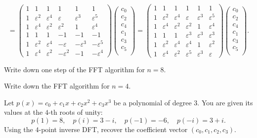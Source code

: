 $$
= \begin{pmatrix}
    1 & 1 & 1 & 1 & 1 & 1\\
    1 & \varepsilon^2 & \varepsilon^4 & \varepsilon & \varepsilon^3 & \varepsilon^5\\
    1 & \varepsilon^4 & \varepsilon^2 & \varepsilon^2 & 1 & \varepsilon^4\\
    1 & 1 & 1 & -1 & -1 & -1\\
    1 & \varepsilon^2 & \varepsilon^4 & -\varepsilon & -\varepsilon^3 & -\varepsilon^5\\
    1 & \varepsilon^4 & \varepsilon^2 & -\varepsilon^2 & -1 & -\varepsilon^4
\end{pmatrix}\begin{pmatrix}
    c_0 \\
    c_2 \\
    c_4 \\
    c_1 \\
    c_3 \\
    c_5 \\
    \end{pmatrix} =
\begin{pmatrix}
    1 & 1 & 1 & 1 & 1 & 1\\
    1 & \varepsilon^2 & \varepsilon^4 & \varepsilon & \varepsilon^3 & \varepsilon^5\\
    1 & \varepsilon^4 & \varepsilon^2 & \varepsilon^2 & 1 & \varepsilon^4\\
    1 & 1 & 1 & \varepsilon^3 & \varepsilon^3 & \varepsilon^3\\
    1 & \varepsilon^2 & \varepsilon^4 & \varepsilon^4 & 1 & \varepsilon^2\\
    1 & \varepsilon^4 & \varepsilon^2 & \varepsilon^5 & \varepsilon^3 & \varepsilon
\end{pmatrix}    \begin{pmatrix}
    c_0 \\
    c_2 \\
    c_4 \\
    c_1 \\
    c_3 \\
    c_5 \\
    \end{pmatrix}.
$$

\begin{problem}
Write down one step of the FFT algorithm for $n = 8$.
\end{problem}

\begin{problem}
Write down the FFT algorithm for $n = 4$.
\end{problem}


\begin{problem}
Let $p(x)=c_0+c_1x+c_2x^2+c_3x^3$ be a polynomial of degree $3$. You are given its values at the $4$-th roots of unity:
$$p(1) = 8, \quad p(i) = 3 - i, \quad p(-1) = -6, \quad p(-i) = 3 + i.$$
Using the $4$-point inverse DFT, recover the coefficient vector $(c_0,c_1,c_2,c_3)$.
\end{problem}
